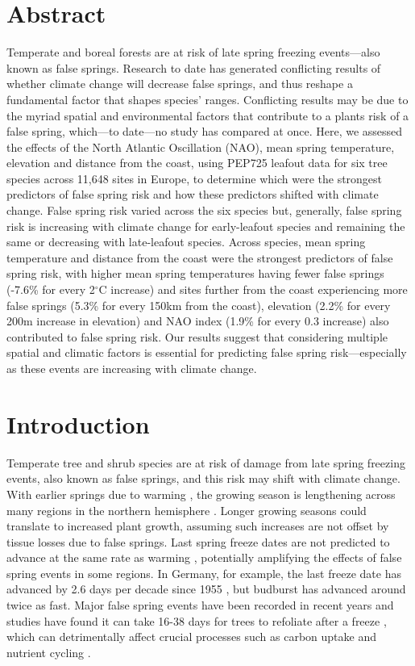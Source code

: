 \documentclass{article}\usepackage[]{graphicx}\usepackage[]{color}
\begin{document}
\section*{Abstract}
Temperate and boreal forests are at risk of late spring freezing events---also known as false springs. Research to date has generated conflicting results of whether climate change will decrease false springs, and thus reshape a fundamental factor that shapes species' ranges. Conflicting results may be due to the myriad spatial and environmental factors that contribute to a plants risk of a false spring, which---to date---no study has compared at once. Here, we assessed the effects of the North Atlantic Oscillation (NAO), mean spring temperature, elevation and distance from the coast, using PEP725 leafout data for six tree species across 11,648 sites in Europe, to determine which were the strongest predictors of false spring risk and how these predictors shifted with climate change. False spring risk varied across the six species but, generally, false spring risk is increasing with climate change for early-leafout species and remaining the same or decreasing with late-leafout species. Across species, mean spring temperature and distance from the coast were the strongest predictors of false spring risk, with higher mean spring temperatures having fewer false springs (-7.6\% for every 2$^{\circ}$C increase) and sites further from the coast experiencing more false springs (5.3\% for every 150km from the coast), elevation (2.2\% for every 200m increase in elevation) and NAO index (1.9\% for every 0.3 increase) also contributed to false spring risk. Our results suggest that considering multiple spatial and climatic factors is essential for predicting false spring risk---especially as these events are increasing with climate change.

\section*{Introduction}
Temperate tree and shrub species are at risk of damage from late spring freezing events, also known as false springs, and this risk may shift with climate change. With earlier springs due to warming \citep{IPCC2014, Wolkovich2012}, the growing season is lengthening across many regions in the northern hemisphere \citep{Chen2005, Kukal2018, Liu2006}. Longer growing seasons could translate to increased plant growth, assuming such increases are not offset by tissue losses due to false springs. Last spring freeze dates are not predicted to advance at the same rate as warming \citep{Inouye2008, Labe2016, Martin2010,Wypych2016a,Sgubin2018}, potentially amplifying the effects of false spring events in some regions. In Germany, for example, the last freeze date has advanced by 2.6 days per decade since 1955 \citep{Zohner2016}, but budburst has advanced around twice as fast. Major false spring events have been recorded in recent years and studies have found it can take 16-38 days for trees to refoliate after a freeze \citep{Augspurger2009, Augspurger2013, Gu2008, Menzel2015}, which can detrimentally affect crucial processes such as carbon uptake and nutrient cycling \citep{Hufkens2012, Klosterman2018, Richardson2013}. 
\end{document}
